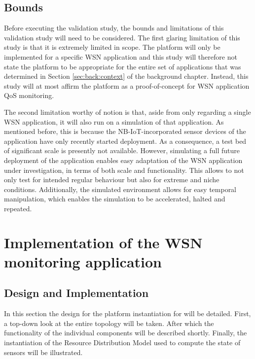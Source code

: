 \subsection{Bounds}
Before executing the validation study, the bounds and limitations of this validation study will need to be considered. The first glaring limitation of this study is that it is extremely limited in scope. The platform will only be implemented for a specific WSN application and this study will therefore not state the platform to be appropriate for the entire set of applications that was determined in Section \ref{sec:back:context} of the background chapter. Instead, this study will at most affirm the platform as a proof-of-concept for WSN application QoS monitoring.

The second limitation worthy of notion is that, aside from only regarding a single WSN application, it will also run on a simulation of that application. As mentioned before, this is because the NB-IoT-incorporated sensor devices of the \sensit application have only recently started deployment. As a consequence, a test bed of significant scale is presently not available. However, simulating a full future deployment of the application enables easy adaptation of the WSN application under investigation, in terms of both scale and functionality. This allows to not only test for intended regular behaviour but also for extreme and niche conditions. Additionally, the simulated environment allows for easy temporal manipulation, which enables the simulation to be accelerated, halted and repeated.

\section{Implementation of the WSN monitoring application}
\subsection{Design and Implementation}
In this section the design for the platform instantiation for \nedap\sensit will be detailed. First, a top-down look at the entire topology will be taken. After which the functionality of the individual components will be described shortly. Finally, the instantiation of the Resource Distribution Model used to compute the state of sensors will be illustrated.

